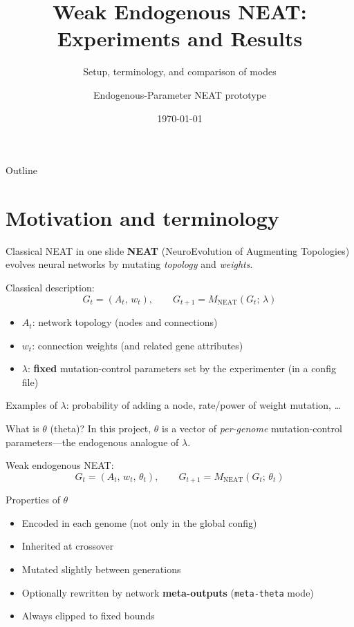 \documentclass[aspectratio=169,11pt]{beamer}
\title{Weak Endogenous NEAT:\\Experiments and Results}
\subtitle{Setup, terminology, and comparison of modes}
\author{Endogenous-Parameter NEAT prototype}
\date{\today}
\begin{document}
\begin{frame}
  \titlepage
\end{frame}

\begin{frame}{Outline}
  \tableofcontents
\end{frame}

\section{Motivation and terminology}

\begin{frame}{Classical NEAT in one slide}
  \textbf{NEAT} (NeuroEvolution of Augmenting Topologies) evolves neural networks by
  mutating \emph{topology} and \emph{weights}.

  \vspace{0.8em}
  Classical description:
  \[
    G_t = (A_t,\, w_t),\qquad
    G_{t+1} = M_{\mathrm{NEAT}}(G_t;\,\lambda)
  \]
  \begin{itemize}
    \item $A_t$: network topology (nodes and connections)
    \item $w_t$: connection weights (and related gene attributes)
    \item $\lambda$: \textbf{fixed} mutation-control parameters set by the experimenter
      (in a config file)
  \end{itemize}

  \vspace{0.5em}
  Examples of $\lambda$: probability of adding a node, rate/power of weight mutation, \ldots
\end{frame}

\begin{frame}{What is $\theta$ (theta)?}
  In this project, \textbf{$\theta$} is a vector of \emph{per-genome}
  mutation-control parameters---the endogenous analogue of $\lambda$.

  \vspace{0.6em}
  Weak endogenous NEAT:
  \[
    G_t = (A_t,\, w_t,\, \theta_t),\qquad
    G_{t+1} = M_{\mathrm{NEAT}}(G_t;\,\theta_t)
  \]

  \begin{block}{Properties of $\theta$}
    \begin{itemize}
      \item Encoded in each genome (not only in the global config)
      \item Inherited at crossover
      \item Mutated slightly between generations
      \item Optionally rewritten by network \textbf{meta-outputs} (\texttt{meta-theta} mode)
      \item Always clipped to fixed bounds
    \end{itemize}
  \end{block}
\end{frame}
\end{document}

